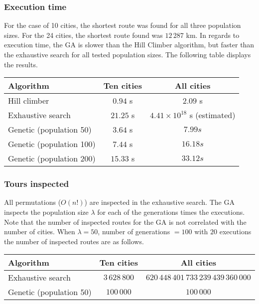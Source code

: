 \documentclass{article}
\begin{document}
\subsubsection*{Execution time}

For the case of 10 cities, the shortest route was found for all three population sizes. For the 24 cities, the shortest route found was $12\,287$ km. In regards to execution time, the GA is slower than the Hill Climber algorithm, but faster than the exhaustive search for all tested population sizes. The following table displays the results.

\begin{center}
\begin{tabular}{lcc}
\toprule
Algorithm & Ten cities & All cities \\
\midrule
Hill climber & $0.94$ s & $2.09$ s \\
Exhaustive search & $21.25$ s & $4.41 \times 10^{18}$ s (estimated) \\
Genetic (population 50) & $3.64$ s & $7.99 s$ \\
Genetic (population 100) & $7.44$ s & $16.18 s$ \\
Genetic (population 200) & $15.33$ s & $33.12 s$ \\
\bottomrule
\end{tabular}
\end{center}

\subsubsection*{Tours inspected}

All permutations ($O(n!)$) are inspected in the exhaustive search. The GA inspects the population size $\lambda$ for each of the generations times the executions. Note that the number of inspected routes for the GA is not correlated with the number of cities. When $\lambda = 50$, number of generations $= 100$ with $20$ executions the number of inspected routes are as follows.

\begin{center}
\begin{tabular}{lcc}
\toprule
Algorithm & Ten cities & All cities \\
\midrule
Exhaustive search & $3\,628\,800$ & $620\,448\,401\,733\,239\,439\,360\,000$ \\
Genetic (population 50) & $100\,000$ & $100\,000$ \\
\bottomrule
\end{tabular}
\end{center}
\end{document}
